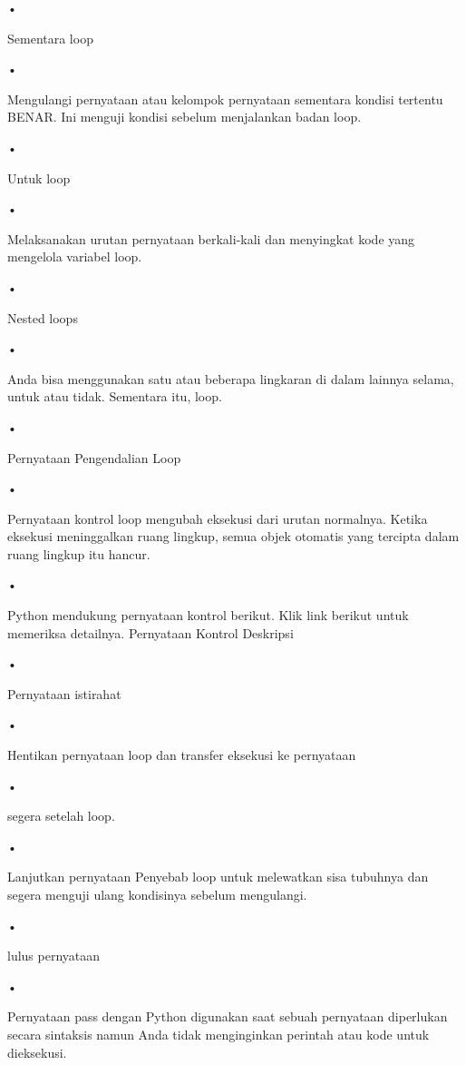 \begin{flushleft}
•
\end{flushleft}Sementara loop
\begin{flushleft}
•
\end{flushleft}Mengulangi pernyataan atau kelompok pernyataan sementara kondisi tertentu BENAR. Ini menguji kondisi sebelum menjalankan badan loop.
\begin{flushleft}
•
\end{flushleft}Untuk loop
\begin{flushleft}
•
\end{flushleft}Melaksanakan urutan pernyataan berkali-kali dan menyingkat kode yang mengelola variabel loop.
\begin{flushleft}
•
\end{flushleft}Nested loops
\begin{flushleft}
•
\end{flushleft}Anda bisa menggunakan satu atau beberapa lingkaran di dalam lainnya selama, untuk atau tidak. Sementara itu, loop.
\begin{flushleft}
•
\end{flushleft}Pernyataan Pengendalian Loop
\begin{flushleft}
•
\end{flushleft}Pernyataan kontrol loop mengubah eksekusi dari urutan normalnya. Ketika eksekusi meninggalkan ruang lingkup, semua objek otomatis yang tercipta dalam ruang lingkup itu hancur.
\begin{flushleft}
•
\end{flushleft}Python mendukung pernyataan kontrol berikut. Klik link berikut untuk memeriksa detailnya.
Pernyataan Kontrol	Deskripsi
\begin{flushleft}
•
\end{flushleft}Pernyataan istirahat
\begin{flushleft}
•
\end{flushleft}Hentikan pernyataan loop dan transfer eksekusi ke pernyataan \begin{flushleft}
•
\end{flushleft}segera setelah loop.
\begin{flushleft}
•
\end{flushleft}Lanjutkan pernyataan
Penyebab loop untuk melewatkan sisa tubuhnya dan segera menguji ulang kondisinya sebelum mengulangi.
\begin{flushleft}
•
\end{flushleft}lulus pernyataan
\begin{flushleft}
•
\end{flushleft}Pernyataan pass dengan Python digunakan saat sebuah pernyataan diperlukan secara sintaksis namun Anda tidak menginginkan perintah atau kode untuk dieksekusi.
